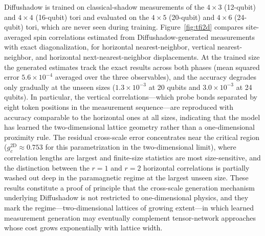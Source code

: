 Diffushadow is trained on classical-shadow measurements of the $4\times3$
(12-qubit) and $4\times4$ (16-qubit) tori and evaluated on the $4\times5$
(20-qubit) and $4\times6$ (24-qubit) tori, which are never seen during
training. Figure~\ref{fig:tfi2d} compares site-averaged spin correlations
estimated from Diffushadow-generated measurements with exact
diagonalization, for horizontal nearest-neighbor, vertical
nearest-neighbor, and horizontal next-nearest-neighbor displacements. At
the trained size the generated estimates track the exact results across
both phases (mean squared error $5.6\times10^{-4}$ averaged over the three
observables), and the accuracy degrades only gradually at the unseen sizes
($1.3\times10^{-3}$ at 20 qubits and $3.0\times10^{-3}$ at 24 qubits).
In particular, the vertical correlations---which probe bonds separated by
eight token positions in the measurement sequence---are reproduced with
accuracy comparable to the horizontal ones at all sizes, indicating that
the model has learned the two-dimensional lattice geometry rather than a
one-dimensional proximity rule. The residual cross-scale error concentrates
near the critical region ($g_c^{2\mathrm{D}}\approx0.753$ for this
parametrization in the two-dimensional limit), where correlation lengths
are largest and finite-size statistics are most size-sensitive, and the
distinction between the $r{=}1$ and $r{=}2$ horizontal correlations is
partially washed out deep in the paramagnetic regime at the largest unseen
size. These results constitute a proof of principle that the cross-scale
generation mechanism underlying Diffushadow is not restricted to
one-dimensional physics, and they mark the regime---two-dimensional
lattices of growing extent---in which learned measurement generation may
eventually complement tensor-network approaches whose cost grows
exponentially with lattice width.


